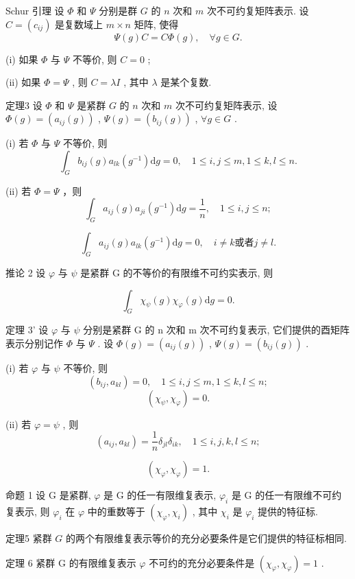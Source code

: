 \documentclass[]{article}
\begin{document}
Schur 引理 设 $\Phi$ 和 $\Psi$ 分别是群 $G$ 的 $n$ 次和 $m$ 次不可约复矩阵表示. 设 $C = (c_{ij})$ 是复数域上 $m \times n$ 矩阵, 使得 
$$
\varPsi (g) C = C \varPhi (g), \quad \forall g \in G. 
$$

(i) 如果 $\Phi$ 与 $\Psi$ 不等价, 则 $C = 0$ ;     

(ii) 如果 $\Phi = \Psi$ , 则 $C = \lambda I$ , 其中 $\lambda$ 是某个复数. 

定理3 设 $\Phi$ 和 $\Psi$ 是紧群 $G$ 的 $n$ 次和 $m$ 次不可约复矩阵表示, 设 $\Phi(g) = (a_{ij}(g))$ , $\Psi(g) = (b_{ij}(g))$ , $\forall g \in G$ . 

(i) 若 $\Phi$ 与 $\Psi$ 不等价, 则$$
\int_ {G} b _ {i j} (g) a _ {l k} \left(g ^ {- 1}\right) \mathrm{d} g = 0, \quad 1 \leqslant i, j \leqslant m, 1 \leqslant k, l \leqslant n. 
$$

(ii) 若 $\Phi = \Psi$ ，则 $$
\int_ {G} a _ {i j} (g) a _ {j i} \left(g ^ {- 1}\right) \mathrm{d} g = \frac {1}{n}, \quad 1 \leqslant i, j \leqslant n; 
$$

$$
\int_ {G} a _ {i j} (g) a _ {l k} \left(g ^ {- 1}\right) \mathrm{d} g = 0, \quad i \neq k \text {或者} j \neq l. 
$$

推论 2 设 $\varphi$ 与 $\psi$ 是紧群 G 的不等价的有限维不可约实表示, 则

$$
\int_ {G} \chi_ {\psi} (g) \chi_ {\varphi} (g) \mathrm{d} g = 0.
$$

定理 3' 设 $\varphi$ 与 $\psi$ 分别是紧群 G 的 n 次和 m 次不可约复表示, 它们提供的酉矩阵表示分别记作 $\Phi$ 与 $\Psi$ . 设 $\Phi(g) = (a_{ij}(g))$ , $\Psi(g) = (b_{ij}(g))$ . 

(i) 若 $\varphi$ 与 $\psi$ 不等价, 则$$
\left(b _ {i j}, a _ {k l}\right) = 0, \quad 1 \leqslant i, j \leqslant m, 1 \leqslant k, l \leqslant n;
$$   
$$
(\chi_ {\psi}, \chi_ {\varphi}) = 0.
$$

(ii) 若 $\varphi = \psi$ , 则$$
(a _ {i j}, a _ {k l}) = \frac {1}{n} \delta_ {j l} \delta_ {i k}, \quad 1 \leqslant i, j, k, l \leqslant n;
$$ 

$$
(\chi_ {\varphi}, \chi_ {\varphi}) = 1.
$$

命题 1 设 G 是紧群, $\varphi$ 是 G 的任一有限维复表示, $\varphi_{i}$ 是 G 的任一有限维不可约复表示, 则 $\varphi_{i}$ 在 $\varphi$ 中的重数等于 $(\chi_{\varphi}, \chi_{i})$ , 其中 $\chi_{i}$ 是 $\varphi_{i}$ 提供的特征标. 

定理5 紧群 $G$ 的两个有限维复表示等价的充分必要条件是它们提供的特征标相同. 

定理 6 紧群 G 的有限维复表示 $\varphi$ 不可约的充分必要条件是 $(\chi_{\varphi}, \chi_{\varphi}) = 1$ . 
\end{document}

